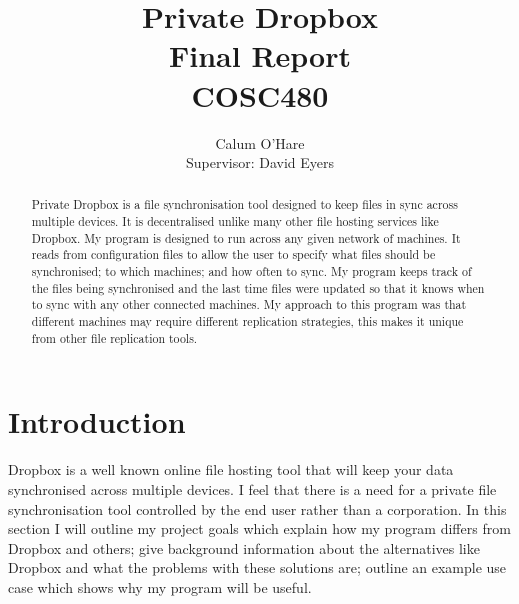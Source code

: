 \documentclass[12pt]{article}
\title{ Private Dropbox \\ Final Report \\ COSC480}
\author{Calum O'Hare \\ Supervisor: David Eyers}
\date{}
\begin{document}
\maketitle

\newpage
\begin{abstract}
Private Dropbox is a file synchronisation tool designed to
keep files in sync across multiple devices. It is decentralised
unlike many other file hosting services like Dropbox.
My program is designed to run across any given network
of machines. It reads from configuration files to allow
the user to specify what files should be synchronised; to which
machines; and how often to sync. My program keeps track
of the files being synchronised and the last time files
were updated so that it knows when to sync with any
other connected machines. My approach to this program
was that different machines may require different replication
strategies, this makes it unique from other file replication tools.
\end{abstract}
\newpage

\tableofcontents
\newpage

\section{Introduction}
Dropbox is a well known online file hosting tool that will
keep your data synchronised across multiple devices. I feel
that there is a need for a private file synchronisation tool
controlled by the end user rather than a corporation. In this
section I will outline my project goals which explain how
my program differs from Dropbox and others; give background
information about the alternatives like Dropbox and what the
problems with these solutions are; outline an example
use case which shows why my program will be useful.
\end{document}
